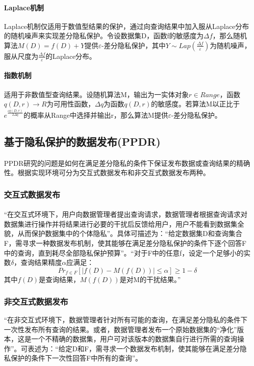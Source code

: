 \documentclass[12pt,a4paper]{article}
\begin{document}
\paragraph{Laplace机制} Laplace机制仅适用于数值型结果的保护，通过向查询结果中加入服从Laplace分布的随机噪声来实现差分隐私保护。令设数据集D，函数f的敏感度为$\Delta f$，那么随机算法$M(D)=f(D)+Y$提供$\varepsilon$-差分隐私保护，其中$Y \sim Lap(\frac{\Delta f}{\varepsilon})$为随机噪声，服从尺度为$\frac{\Delta f}{\varepsilon}$的Laplace分布。

\paragraph{指数机制} 适用于非数值型查询结果。设随机算法M，输出为一实体对象$r \in Range$，函数$q(D,r)\rightarrow R $为可用性函数，$\Delta q$为函数$q(D,r)$的敏感度。若算法M以正比于$e^{\frac{\varepsilon q(D,r)}{2\Delta q}}$的概率从Range中选择并输出r，那么算法M提供$\varepsilon$-差分隐私保护。

\subsection{基于隐私保护的数据发布(PPDR)}
\paragraph{} PPDR研究的问题是如何在满足差分隐私的条件下保证发布数据或查询结果的精确性。根据实现环境可分为交互式数据发布和非交互式数据发布两种。
\subsubsection{交互式数据发布}
\paragraph{} “在交互式环境下，用户向数据管理者提出查询请求，数据管理者根据查询请求对数据集进行操作并将结果进行必要的干扰后反馈给用户，用户不能看到数据集全貌，从而保护数据集中的个体隐私”。具体可描述为：“给定数据集D和查询集合F，需寻求一种数据发布机制，使其能够在满足差分隐私保护的条件下逐个回答F中的查询，直到耗尽全部隐私保护预算”。“对于F中的任意f，设定一个足够小的实数$\delta$，查询结果精度$\alpha$应满足：
\begin{equation}
	Pr_{f\in F}[|f(D)-M(f(D))|\leq \alpha]\geq 1-\delta
\end{equation}
其中$f(D)$是查询结果，$M(f(D))$是对M的干扰结果。”
\subsubsection{非交互式数据发布} “在非交互式环境下，数据管理者针对所有可能的查询，在满足差分隐私的条件下一次性发布所有查询的结果。或者，数据管理者发布一个原始数据集的“净化”版本，这是一个不精确的数据集，用户可对该版本的数据集自行进行所需的查询操作”。可表述为：“给定D和F，需寻求一个数据发布机制，使其能够在满足差分隐私保护的条件下一次性回答F中所有的查询”。



\end{document}
